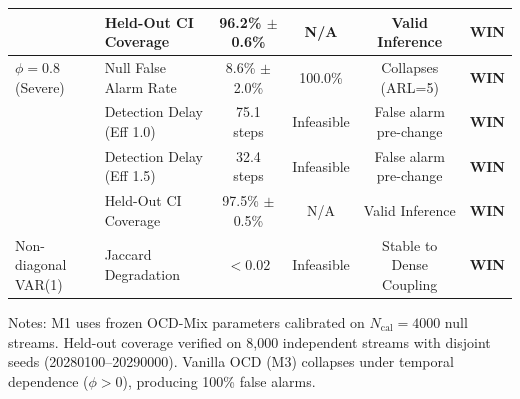 \begin{table}[t]
\begin{small}
\begin{tabular}{llcccc}
 & Held-Out CI Coverage & 96.2\% $\pm$ 0.6\% & N/A & Valid Inference & \textbf{WIN} \\
\midrule
$\phi = 0.8$ (Severe) & Null False Alarm Rate & 8.6\% $\pm$ 2.0\% & 100.0\% & Collapses (ARL=5) & \textbf{WIN} \\
 & Detection Delay (Eff 1.0) & 75.1 steps & Infeasible & False alarm pre-change & \textbf{WIN} \\
 & Detection Delay (Eff 1.5) & 32.4 steps & Infeasible & False alarm pre-change & \textbf{WIN} \\
 & Held-Out CI Coverage & 97.5\% $\pm$ 0.5\% & N/A & Valid Inference & \textbf{WIN} \\
\midrule
Non-diagonal VAR(1) & Jaccard Degradation & $< 0.02$ & Infeasible & Stable to Dense Coupling & \textbf{WIN} \\
\bottomrule
\end{tabular}
\end{small}
\par\vspace{1ex}\raggedright\footnotesize{Notes: M1 uses frozen OCD-Mix parameters calibrated on $N_{\text{cal}}=4000$ null streams. Held-out coverage verified on 8,000 independent streams with disjoint seeds (20280100--20290000). Vanilla OCD (M3) collapses under temporal dependence ($\phi > 0$), producing 100\% false alarms.}
\end{table}